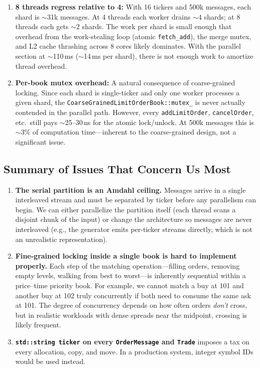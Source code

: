 \documentclass[11pt]{article}
\begin{document}
\begin{enumerate}
    \item \textbf{8 threads regress relative to 4:} With 16 tickers and 500k messages, each shard is $\sim$31k messages. At 4 threads each worker drains $\sim$4 shards; at 8 threads each gets $\sim$2 shards. The work per shard is small enough that overhead from the work-stealing loop (atomic \texttt{fetch\_add}), the merge mutex, and L2 cache thrashing across 8 cores likely dominates. With the parallel section at $\sim$110\,ms ($\sim$14\,ms per shard), there is not enough work to amortize thread overhead.

    \item \textbf{Per-book mutex overhead:} A natural consequence of coarse-grained locking. Since each shard is single-ticker and only one worker processes a given shard, the \texttt{CoarseGrainedLimitOrderBook::mutex\_} is never actually contended in the parallel path. However, every \texttt{addLimitOrder}, \texttt{cancelOrder}, etc.\ still pays $\sim$25--30\,ns for the atomic lock/unlock. At 500k messages this is $\sim$3\% of computation time---inherent to the coarse-grained design, not a significant issue.
\end{enumerate}


\subsection*{Summary of Issues That Concern Us Most}

\begin{enumerate}
    \item \textbf{The serial partition is an Amdahl ceiling.} Messages arrive in a single interleaved stream and must be separated by ticker before any parallelism can begin. We can either parallelize the partition itself (each thread scans a disjoint chunk of the input) or change the architecture so messages are never interleaved (e.g., the generator emits per-ticker streams directly, which is not an unrealistic representation).

    \item \textbf{Fine-grained locking inside a single book is hard to implement properly.} Each step of the matching operation---filling orders, removing empty levels, walking from best to worst---is inherently sequential within a price--time priority book. For example, we cannot match a buy at 101 and another buy at 102 truly concurrently if both need to consume the same ask at 101. The degree of concurrency depends on how often orders \emph{don't} cross, but in realistic workloads with dense spreads near the midpoint, crossing is likely frequent.

    \item \textbf{\texttt{std::string ticker} on every \texttt{OrderMessage} and \texttt{Trade}} imposes a tax on every allocation, copy, and move. In a production system, integer symbol IDs would be used instead.
\end{enumerate}
\end{document}

